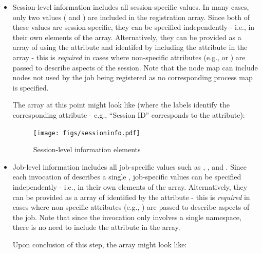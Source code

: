 \begin{itemize}
\item Session-level information includes all session-specific values. In many cases, only two values ( and ) are included in the registration array. Since both of these values are session-specific, they can be specified independently - i.e., in their own  elements of the  array. Alternatively, they can be provided as a  array of  using the  attribute and identifed by including the  attribute in the array - this is \emph{required} in cases where non-specific attributes (e.g.,  or ) are passed to describe aspects of the session. Note that the node map can include nodes not used by the job being registered as no corresponding process map is specified.

The  array at this point might look like (where the labels identify the corresponding attribute - e.g., ``Session ID'' corresponds to the  attribute):

\begingroup
\begin{figure}[ht!]
  \begin{center}
    \texttt{[image: figs/sessioninfo.pdf]}
  \end{center}
  \caption{Session-level information elements}
  \label{fig:sessioninfo}
\end{figure}
\endgroup


\item Job-level information includes all job-specific values such as , , and . Since each invocation of  describes a single , job-specific values can be specified independently - i.e., in their own  elements of the  array. Alternatively, they can be provided as a  array of  identified by the  attribute - this is \emph{required} in cases where non-specific attributes (e.g., ) are passed to describe aspects of the job. Note that since the invocation only involves a single namespace, there is no need to include the  attribute in the array.

Upon conclusion of this step, the  array might look like:


\end{itemize}
